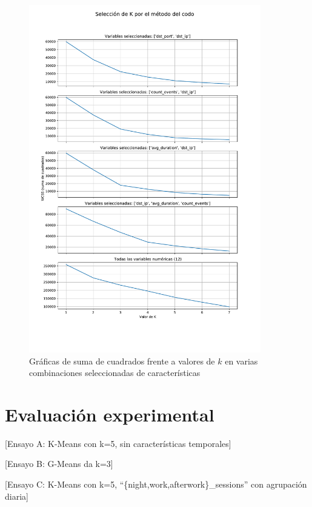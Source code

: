 \begin{figure}[h]
    \centering
    \captionsetup{width=0.75\textwidth}
    \includegraphics[width=0.9\textwidth]{contenido/fig/codo.pdf}
    \caption{Gráficas de suma de cuadrados frente a valores de $k$ en varias combinaciones seleccionadas de características}
    \label{fig:codo}
\end{figure}

\section{Evaluación experimental}\label{sec:evaluacionexperimental}

[Ensayo A: K-Means con k=5, sin características temporales]

[Ensayo B: G-Means da k=3]

[Ensayo C: K-Means con k=5, ``\{night,work,afterwork\}\_sessions'' con agrupación diaria]

